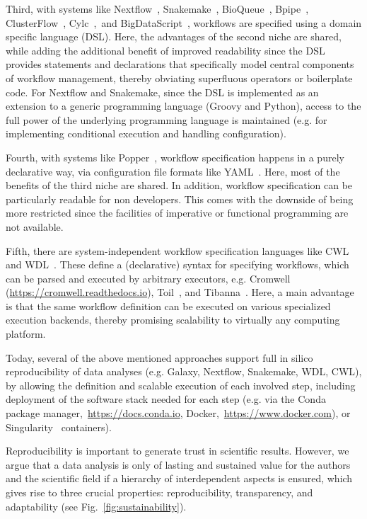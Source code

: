 \documentclass[parskip=half]{scrartcl}
\let\plainurl\url
\renewcommand{\url}[1]{\protect\plainurl{#1}}
\begin{document}
Third, with systems like Nextflow~\parencite{Di_Tommaso_2017}, Snakemake~\parencite{Köster2012}, BioQueue~\parencite{Yao2017}, Bpipe~\parencite{Sadedin2012}, ClusterFlow~\parencite{Ewels2016}, Cylc~\parencite{J_Oliver_2018},~and BigDataScript~\parencite{Cingolani_2014}, workflows are specified using a domain specific language (DSL).
Here, the advantages of the second niche are shared, while adding the additional benefit of improved readability since the DSL provides statements and declarations that specifically model central components of workflow management, thereby obviating superfluous operators or boilerplate code.
For Nextflow and Snakemake, since the DSL is implemented as an extension to a generic programming language (Groovy and Python), access to the full power of the underlying programming language is maintained (e.g. for implementing conditional execution and handling configuration).

Fourth, with systems like Popper~\parencite{Jimenez_2017}, workflow specification happens in a purely declarative way, via configuration file formats like YAML~\parencite{Evans2009-vp}.
Here, most of the benefits of the third niche are shared.
In addition, workflow specification can be particularly readable for non developers.
This comes with the downside of being more restricted since the facilities of imperative or functional programming are not available.

Fifth, there are system-independent workflow specification languages like CWL~\parencite{cwl} and WDL~\parencite{voss_full-stack_2017}.
These define a (declarative) syntax for specifying workflows, which can be parsed and executed by arbitrary executors, e.g. Cromwell (\url{https://cromwell.readthedocs.io}), Toil~\parencite{Vivian_2017}, and Tibanna~\parencite{Lee_2019}.
Here, a main advantage is that the same workflow definition can be executed on various specialized execution backends, thereby promising scalability to virtually any computing platform.

Today, several of the above mentioned approaches support full in silico reproducibility of data analyses (e.g. Galaxy, Nextflow, Snakemake, WDL, CWL), by allowing the definition and scalable execution of each involved step, including deployment of the software stack needed for each step (e.g. via the Conda package manager,~\url{https://docs.conda.io}, Docker,~\url{https://www.docker.com}), or Singularity~\parencite{kurtzer_singularity_2017} containers).

Reproducibility is important to generate trust in scientific results.
However, we argue that a data analysis is only of lasting and sustained value for the authors and the scientific field if a hierarchy of interdependent aspects is ensured, which gives rise to three crucial properties: reproducibility, transparency, and adaptability (see Fig.~\ref{fig:sustainability}).
\end{document}

